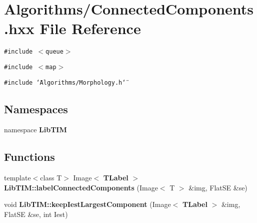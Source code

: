 \section{Algorithms/Connected\-Components.hxx File Reference}
\label{ConnectedComponents_8hxx}
{\tt \#include $<$queue$>$}\par
{\tt \#include $<$map$>$}\par
{\tt \#include \char`\"{}Algorithms/Morphology.h\char`\"{}}\par
\subsection*{Namespaces}
\begin{CompactItemize}
\item 
namespace {\bf Lib\-TIM}
\end{CompactItemize}
\subsection*{Functions}
\begin{CompactItemize}
\item 
template$<$class T$>$ Image$<$ {\bf TLabel} $>$ {\bf Lib\-TIM::label\-Connected\-Components} (Image$<$ T $>$ \&img, Flat\-SE \&se)
\item 
void {\bf Lib\-TIM::keep\-Iest\-Largest\-Component} (Image$<$ {\bf TLabel} $>$ \&img, Flat\-SE \&se, int Iest)
\end{CompactItemize}
